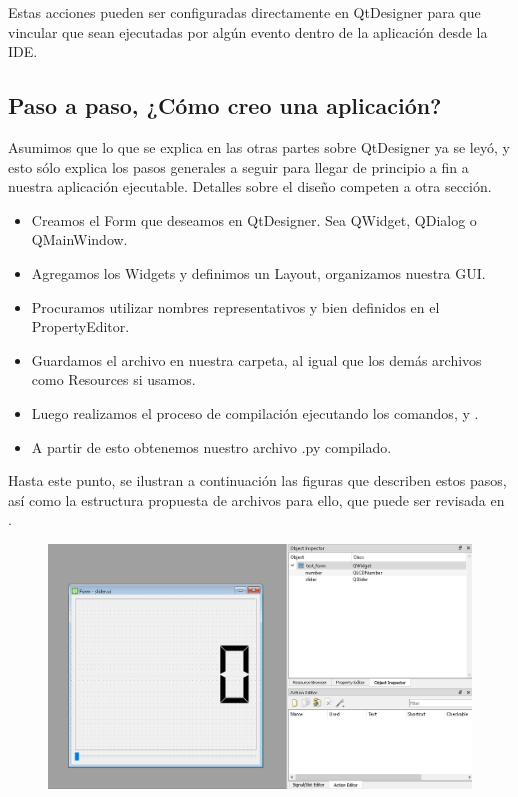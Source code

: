 Estas acciones pueden ser configuradas directamente en QtDesigner para que vincular que sean
ejecutadas por alg\'un evento dentro de la aplicaci\'on desde la IDE.

\subsection{Paso a paso, ¿C\'omo creo una aplicaci\'on?}
Asumimos que lo que se explica en las otras partes sobre QtDesigner ya se ley\'o, y esto s\'olo explica los pasos generales a seguir
para llegar de principio a fin a nuestra aplicaci\'on ejecutable. Detalles sobre el dise\~no competen a otra secci\'on.

\begin{itemize}
    \item Creamos el Form que deseamos en QtDesigner. Sea QWidget, QDialog o QMainWindow.
    \item Agregamos los Widgets y definimos un Layout, organizamos nuestra GUI.
    \item Procuramos utilizar nombres representativos y bien definidos en el PropertyEditor.
    \item Guardamos el archivo en nuestra carpeta, al igual que los dem\'as archivos como Resources si usamos.
    \item Luego realizamos el proceso de compilaci\'on ejecutando los comandos,  y .
    \item A partir de esto obtenemos nuestro archivo .py compilado.
\end{itemize}

Hasta este punto, se ilustran a continuaci\'on las figuras que describen estos pasos, as\'i como la estructura propuesta de archivos para ello,
que puede ser revisada en .

\begin{figure}[H]
    \centering
    \includegraphics[scale=0.4]{imagenes/qtdesigner/qt_steps.PNG}
\end{figure}

